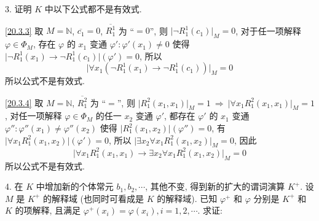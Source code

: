 \documentclass[boxes]{homework}
\begin{document}
\setlength\abovedisplayskip{.125em}
\setlength\belowdisplayskip{.125em}
\begin{problem}
3. 证明 $K$ 中以下公式都不是有效式.
\end{problem}

\begin{solution}
    \ref{20.3.3} 取 $M = \mathbb{N}$, $\overline{c_1} = 0$, $\overline{R_1^1}$ 为 ``$=0$'', 则 $\lvert\lnot R_1^1(c_1)\rvert_M = 0$,  对于任一项解释 $\varphi\in\Phi_M$, 存在 $\varphi$ 的 $x_1$ 变通 $\varphi' : \varphi'(x_1)\neq 0$ 使得 $\lvert\lnot R_1^1(x_1)\to \lnot R_1^1(c_1)\rvert(\varphi') = 0$, 所以
    $$
        \lvert\forall x_1 (\lnot R_1^1(x_1)\to \lnot R_1^1(c_1))\rvert_M = 0
    $$
    所以公式不是有效式.

    \ref{20.3.4} 取 $M = \mathbb{N}$, $\overline{R_1^2}$ 为 ``$=$'', 则 $\lvert R_1^2(x_1, x_1)\rvert_M = 1\ \Rightarrow\ \lvert\forall x_1 R_1^2(x_1, x_1)\rvert_M = 1$, 对任一项解释 $\varphi\in\Phi_M$ 的任一 $x_2$ 变通 $\varphi'$, 都存在 $\varphi'$ 的 $x_1$ 变通 $\varphi'': \varphi''(x_1)\neq\varphi''(x_2)$ 使得 $\lvert R_1^2(x_1, x_2)\rvert(\varphi'') = 0$, 有 $\lvert\forall x_1 R_1^2(x_1, x_2)\rvert(\varphi') = 0$, 所以 $\lvert\exists x_2\forall x_1 R_1^2(x_1, x_2)\rvert_M = 0$, 因此
    $$
        \lvert\forall x_1 R_1^2(x_1, x_1)\to \exists x_2 \forall x_1 R_1^2(x_1, x_2)\rvert_M = 0
    $$
    所以公式不是有效式.
\end{solution}

\begin{problem}
4. 在 $K$ 中增加新的个体常元 $b_1, b_2, \cdots$, 其他不变, 得到新的扩大的谓词演算 $K^+$. 设 $M$ 是 $K^+$ 的解释域 (也同时可看成是 $K$ 的解释域). 已知 $\varphi^+$ 和 $\varphi$ 分别是 $K^+$ 和 $K$ 的项解释, 且满足 $\varphi^+(x_i)=\varphi(x_i), i = 1, 2, \cdots$. 求证:
\end{problem}
\end{document}
